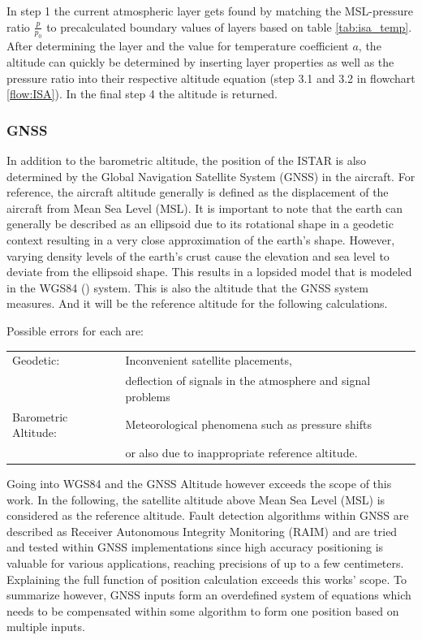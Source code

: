 In step 1 the current atmospheric layer gets found by matching the MSL-pressure ratio  $\frac{p}{p_0}$ to precalculated boundary values of layers based on table \ref{tab:isa_temp}. After determining the layer and the value for temperature coefficient $a$, the altitude can quickly be determined by inserting layer properties as well as the pressure ratio into their respective altitude equation (step 3.1 and 3.2 in flowchart \ref{flow:ISA}). In the final step 4 the altitude is returned.

\subsubsection{GNSS}
In addition to the barometric altitude, the position of the ISTAR is also determined by the Global Navigation Satellite System (GNSS) in the aircraft.
For reference, the aircraft altitude generally is defined as the displacement of the aircraft from Mean Sea Level (MSL). It is important to note that the earth can generally be described as an ellipsoid due to its rotational shape in a geodetic context resulting in a very close approximation of the earth's shape. However, varying density levels of the earth's crust cause the elevation and sea level to deviate from the ellipsoid shape. This results in a lopsided model that is modeled in the WGS84 (\cite{schwarz_wgs_1998}) system. This is also the altitude that the GNSS system measures. And it will be the reference altitude for the following calculations.

Possible errors for each are:

\begin{tabular}[h]{ll}
    Geodetic:            & Inconvenient satellite placements,               \\ & deflection of signals in the atmosphere and signal problems \\
    Barometric Altitude: & Meteorological phenomena such as pressure shifts \\ & or also due to inappropriate reference altitude. \\
\end{tabular}

Going into WGS84 and the GNSS Altitude however exceeds the scope of this work. In the following, the satellite altitude above Mean Sea Level (MSL) is considered as the reference altitude. Fault detection algorithms within GNSS are described as Receiver Autonomous Integrity Monitoring (RAIM) and are tried and tested within GNSS implementations since high accuracy positioning is valuable for various applications, reaching precisions of up to a few centimeters. Explaining the full function of position calculation exceeds this works' scope. To summarize however, GNSS inputs form an overdefined system of equations which needs to be compensated within some algorithm to form one position based on multiple inputs. \cite{teunissen_springer_2017}



